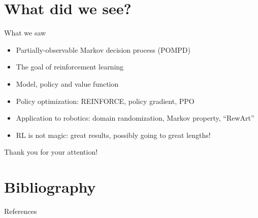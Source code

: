 \documentclass[10pt, aspectratio=1610]{beamer}
\begin{document}
\section{What did we see?}

\begin{frame}{What we saw}
    \begin{itemize}
        \item Partially-observable Markov decision process (POMPD)
        \item The goal of reinforcement learning
        \item Model, policy and value function
        \item Policy optimization: REINFORCE, policy gradient, PPO
        \item Application to robotics: domain randomization, Markov property, ``RewArt''
        \item RL is not magic: great results, possibly going to great lengths!
    \end{itemize}
\end{frame}

\begin{frame}[standout]
    Thank you for your attention!
\end{frame}

\section*{Bibliography}

\renewcommand*{\bibfont}{\footnotesize}
\begin{frame}[allowframebreaks]{References}
    \printbibliography[heading=none]
\end{frame}
\end{document}
